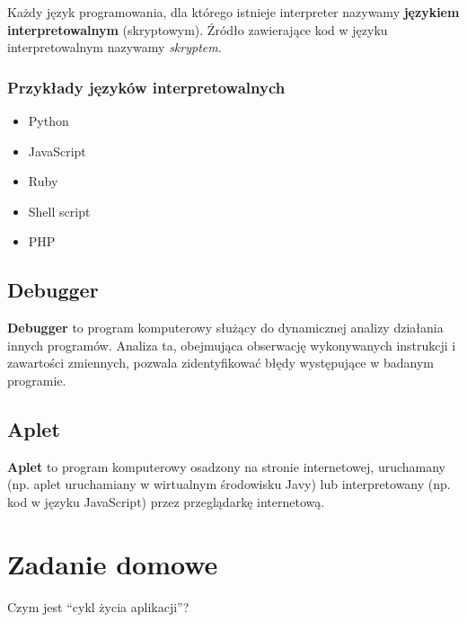 \documentclass[a4paper]{article}
\begin{document}
Każdy język programowania, dla którego istnieje interpreter nazywamy \textbf{językiem interpretowalnym} (skryptowym). Źródło zawierające kod w języku interpretowalnym nazywamy \emph{skryptem}.

\subsubsection{Przykłady języków interpretowalnych}
\begin{itemize}
    \item Python
    \item JavaScript
    \item Ruby
    \item Shell script
    \item PHP
\end{itemize}
\subsection{Debugger}
\textbf{Debugger} to program komputerowy służący do dynamicznej analizy działania innych programów. Analiza ta, obejmująca obserwację wykonywanych instrukcji i zawartości zmiennych, pozwala zidentyfikować błędy występujące w badanym programie.
\subsection{Aplet}
\textbf{Aplet} to program komputerowy osadzony na stronie internetowej, uruchamany (np. aplet uruchamiany w wirtualnym środowisku Javy) lub interpretowany (np. kod w języku JavaScript) przez przeglądarkę internetową.
\section{Zadanie domowe}
Czym jest ``cykl życia aplikacji''?
\end{document}
